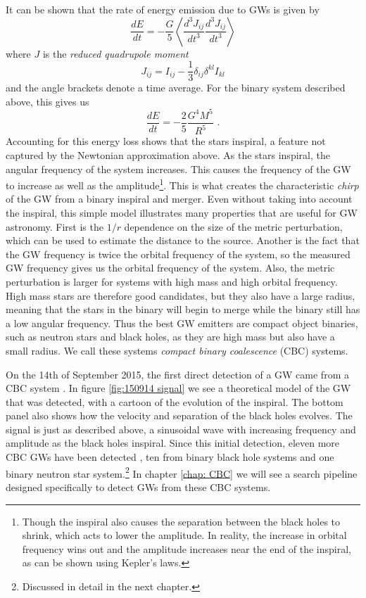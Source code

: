 \documentclass[11pt]{cuthesis}
\newcommand{\fs}{\text{ .}}
\begin{document}
It can be shown that the rate of energy emission due to GWs is given by \cite{carroll-spacetime}
\begin{equation}
\frac{dE}{dt} = - \frac{G}{5} \left\langle \frac{d^3 J_{ij}}{dt^3} \frac{d^3 J_{ij}}{dt^3}  \right\rangle
\end{equation}
where $J$ is the \textit{reduced quadrupole moment}
\begin{equation}
J_{ij} = I_{ij} - \frac{1}{3} \delta_{ij} \delta^{kl} I_{kl} 
\end{equation}
and the angle brackets denote a time average. For the binary system described above, this gives us
\begin{equation}
\frac{dE}{dt} = -\frac{2}{5} \frac{G^4 M^5}{R^5} \fs
\end{equation}
Accounting for this energy loss shows that the stars inspiral, a feature not captured by the Newtonian approximation above. As the stars inspiral, the angular frequency of the system increases. This causes the frequency of the GW to increase as well as the amplitude\footnote{Though the inspiral also causes the separation between the black holes to shrink, which acts to lower the amplitude. In reality, the increase in orbital frequency wins out and the amplitude increases near the end of the inspiral, as can be shown using Kepler's laws.}. This is what creates the characteristic \textit{chirp} of the GW from a binary inspiral and merger. Even without taking into account the inspiral, this simple model illustrates many properties that are useful for GW astronomy. First is the $1/r$ dependence on the size of the metric perturbation, which can be used to estimate the distance to the source. Another is the fact that the GW frequency is twice the orbital frequency of the system, so the measured GW frequency gives us the orbital frequency of the system. Also, the metric perturbation is larger for systems with high mass and high orbital frequency. High mass stars are therefore good candidates, but they also have a large radius, meaning that the stars in the binary will begin to merge while the binary still has a low angular frequency. Thus the best GW emitters  are compact object binaries, such as neutron stars and black holes, as they are high mass but also have a small radius. We call these systems \textit{compact binary coalescence} (CBC) systems. 

On the 14th of September 2015, the first direct detection of a GW came from a CBC system \cite{150914-det-paper}. In figure \ref{fig:150914 signal} we see a theoretical model of the GW that was detected, with a cartoon of the evolution of the inspiral. The bottom panel also shows how the velocity and separation of the black holes evolves. The signal is just as described above, a sinusoidal wave with increasing frequency and amplitude as the black holes inspiral.  Since this initial detection, eleven more CBC GWs have been detected \cite{catalog}, ten from binary black hole systems and one binary neutron star system.\footnote{Discussed in detail in the next chapter.} In chapter \ref{chap: CBC} we will see a search pipeline designed specifically to detect GWs from these CBC systems. 
\end{document}
